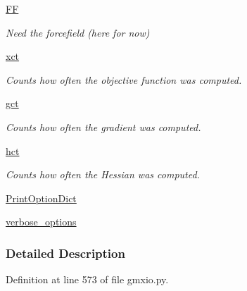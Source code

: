 \begin{DoxyCompactItemize}
\hyperlink{classforcebalance_1_1target_1_1Target_a796dc30a19a60c63fb43b088d40a963f}{\-F\-F}
\begin{DoxyCompactList}\small\item\em \-Need the forcefield (here for now) \end{DoxyCompactList}\item 
\hyperlink{classforcebalance_1_1target_1_1Target_ad4cd0ab38d8fc97d3e7a6e22ce130a16}{xct}
\begin{DoxyCompactList}\small\item\em \-Counts how often the objective function was computed. \end{DoxyCompactList}\item 
\hyperlink{classforcebalance_1_1target_1_1Target_aff6e42b84dd8eb5a4dc3b47aa58bc64c}{gct}
\begin{DoxyCompactList}\small\item\em \-Counts how often the gradient was computed. \end{DoxyCompactList}\item 
\hyperlink{classforcebalance_1_1target_1_1Target_ae929918b7e695a99d7ec946d06d793e1}{hct}
\begin{DoxyCompactList}\small\item\em \-Counts how often the \-Hessian was computed. \end{DoxyCompactList}\item 
\hyperlink{classforcebalance_1_1BaseClass_afc6659278497d7245bc492ecf405ccae}{\-Print\-Option\-Dict}
\item 
\hyperlink{classforcebalance_1_1BaseClass_afd68efa29ccd2f320f4cf82198214aac}{verbose\-\_\-options}
\end{DoxyCompactItemize}


\subsubsection{\-Detailed \-Description}


\-Definition at line 573 of file gmxio.\-py.



